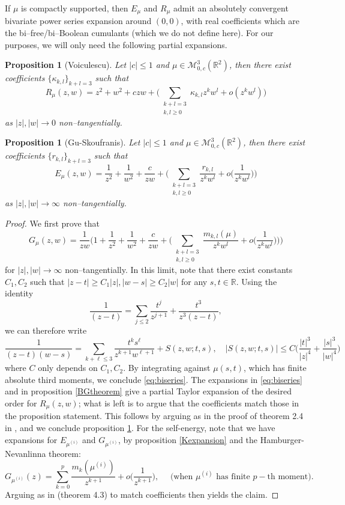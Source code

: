 \documentclass{amsart}
\newtheorem{proposition}[theorem]{Proposition}
\theoremstyle{definition}
\theoremstyle{remark}
\numberwithin{equation}{section}
\begin{document}
If $\mu$ is compactly supported, then $E_\mu$ and $R_\mu$ admit an absolutely convergent bivariate power series expansion around $(0,0)$, with real coefficients which are the bi--free/bi--Boolean cumulants (which we do not define here). For our purposes, we will only need the following partial expansions.
\begin{proposition}[Voiculescu]\label{biRexpansion}Let $|c|\leq 1$ and $\mu \in \mathcal{M}_{0,c}^{3}(\mathbb{R}^2)$, then there exist coefficients $\{\kappa_{k,l}\}_{k+l=3}$ such that
\[
    R_\mu(z,w)=z^2+w^2+czw+\bigg(\sum_{\substack{k+l=3\\k,l \geq 0}}\kappa_{k,l}z^kw^l + o(z^kw^l)\bigg)
\]
as $|z|,|w|\to 0$ non--tangentially.
\end{proposition}

\begin{proposition}[Gu-Skoufranis]\label{biEexpansion}Let $|c|\leq 1$ and $\mu \in\mathcal{M}_{0,c}^3(\mathbb{R}^2)$, then there exist coefficients $\{r_{k,l}\}_{k+l=3}$ such that
\[
    E_\mu(z,w)=\frac{1}{z^2}+\frac{1}{w^2}+\frac{c}{zw}+\bigg(\sum_{\substack{k+l=3\\k,l \geq 0}}\frac{r_{k,l}}{z^{k}w^{l}} + o\Big(\frac{1}{z^{k}w^{l}}\Big)\bigg)
\]
as $|z|,|w|\to \infty$ non--tangentially.
\end{proposition}
\begin{proof}
    We first prove that
    \begin{equation}\label{eq:biseries}
               G_\mu(z,w)=\frac{1}{zw}\Bigg(1+\frac{1}{z^2}+\frac{1}{w^2}+\frac{c}{zw}+\bigg(\sum_{\substack{k+l=3\\k,l \geq 0}}\frac{m_{k,l}(\mu)}{z^{k}w^{l}} + o\Big(\frac{1}{z^{k}w^{l}}\Big)\bigg)\Bigg)
    \end{equation}
    for $|z|,|w|\to \infty$
    non--tangentially. In this limit, note that there exist constants $C_1,C_2$ such that $|z-t|\geq C_1|z|, |w-s|\geq C_2|w|$ for any $s,t\in \mathbb{R}$. Using the identity
    \[
        \frac{1}{(z-t)}=\sum_{j\leq 2} \frac{t^j}{z^{j+1}}+\frac{t^{3}}{z^{3}(z-t)},
    \]
    we can therefore write
    \[
        \frac{1}{(z-t)(w-s)}=\sum_{k+\ell\leq 3} \frac{t^ks^\ell}{z^{k+1}w^{\ell+1}}+S(z,w;t,s),\quad |S(z,w;t,s)|\leq C\Big(\frac{|t|^3}{|z|^4}+\frac{|s|^3}{|w|^4}\Big)
    \]
    where $C$ only depends on $C_1,C_2$. By integrating against $\mu(s,t)$, which has finite absolute third moments, we conclude \eqref{eq:biseries}.
    The expansions in \eqref{eq:biseries} and in proposition \ref{BGtheorem} give a partial Taylor expansion of the desired order for $R_\mu(z,w)$; what is left is to argue that the coefficients match those in the proposition statement. This follows by arguing as in the proof of theorem 2.4 in \cite{Voiculescu2}, and we conclude proposition \ref{biRexpansion}. For the self-energy, note that we have expansions for $E_{\mu^{(i)}}$ and $G_{\mu^{(i)}}$, by proposition \ref{Kexpansion} and the Hamburger-Nevanlinna theorem:
    \[  
        G_{\mu^{(i)}}(z)=\sum_{k=0}^p \frac{m_k({\mu^{(i)}})}{z^{k+1}}+o\Big(\frac{1}{z^{k+1}}\Big),\quad \text{ (when ${\mu^{(i)}}$ has finite $p-$th moment)}.
    \]
    Arguing as in \cite{GuSkoufranis} (theorem 4.3) to match coefficients then yields the claim.
\end{proof}
\end{document}
